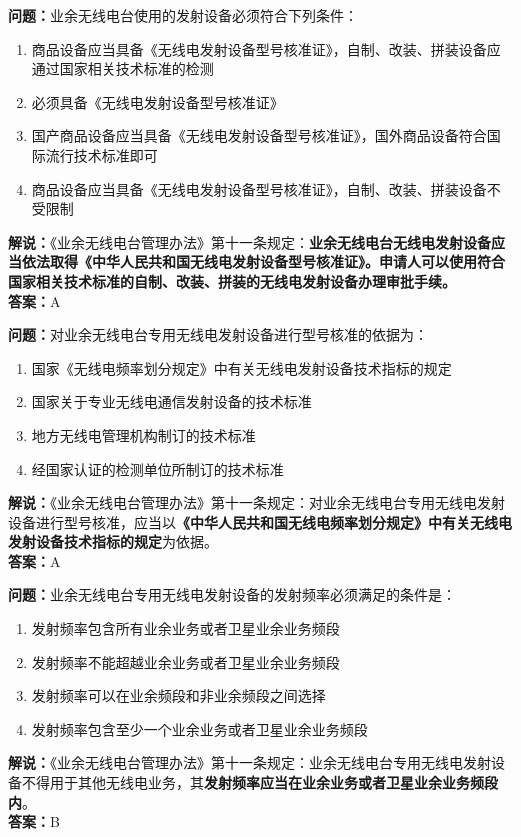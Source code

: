 \bigskip


\noindent\textbf{问题：}业余无线电台使用的发射设备必须符合下列条件：
\begin{enumerate}[label=\Alph*), leftmargin=3em]
\item 商品设备应当具备《无线电发射设备型号核准证》，自制、改装、拼装设备应通过国家相关技术标准的检测
\item 必须具备《无线电发射设备型号核准证》
\item 国产商品设备应当具备《无线电发射设备型号核准证》，国外商品设备符合国际流行技术标准即可
\item 商品设备应当具备《无线电发射设备型号核准证》，自制、改装、拼装设备不受限制
\end{enumerate}
\noindent\textbf{解说：}《业余无线电台管理办法》第十一条规定：\textbf{业余无线电台无线电发射设备应当依法取得《中华人民共和国无线电发射设备型号核准证》。申请人可以使用符合国家相关技术标准的自制、改装、拼装的无线电发射设备办理审批手续。}\\\noindent\textbf{答案：}A




\bigskip


\noindent\textbf{问题：}对业余无线电台专用无线电发射设备进行型号核准的依据为：
\begin{enumerate}[label=\Alph*), leftmargin=3em]
\item 国家《无线电频率划分规定》中有关无线电发射设备技术指标的规定
\item 国家关于专业无线电通信发射设备的技术标准
\item 地方无线电管理机构制订的技术标准
\item 经国家认证的检测单位所制订的技术标准
\end{enumerate}
\noindent\textbf{解说：}《业余无线电台管理办法》第十一条规定：对业余无线电台专用无线电发射设备进行型号核准，应当以\textbf{《中华人民共和国无线电频率划分规定》中有关无线电发射设备技术指标的规定}为依据。\\\noindent\textbf{答案：}A




\bigskip


\noindent\textbf{问题：}业余无线电台专用无线电发射设备的发射频率必须满足的条件是：
\begin{enumerate}[label=\Alph*), leftmargin=3em]
\item 发射频率包含所有业余业务或者卫星业余业务频段
\item 发射频率不能超越业余业务或者卫星业余业务频段
\item 发射频率可以在业余频段和非业余频段之间选择
\item 发射频率包含至少一个业余业务或者卫星业余业务频段
\end{enumerate}
\noindent\textbf{解说：}《业余无线电台管理办法》第十一条规定：业余无线电台专用无线电发射设备不得用于其他无线电业务，其\textbf{发射频率应当在业余业务或者卫星业余业务频段内}。\\\noindent\textbf{答案：}B




